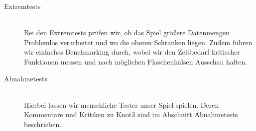 \begin{description}
\clearpage
	
	
	\item[Extremtests] \hfill
	\\
	
	Bei den Extremtests prüfen wir, ob das Spiel  größere Datenmengen Problemlos verarbeitet und wo die oberen Schranken liegen. Zudem führen wir einfaches Benchmarking durch, wobei wir den Zeitbedarf kritischer Funktionen messen und nach möglichen Flaschenhälsen Ausschau halten.\\


	\item[Abnahmetests] \hfill
	\\
	
	Hierbei lassen wir menschliche Tester unser Spiel spielen. Deren Kommentare und Kritiken zu Knot3 sind im Abschnitt Abnahmetests beschrieben.\\
		
\end{description}







